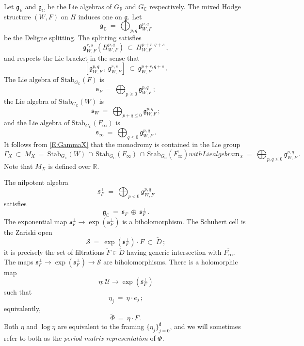 \documentclass[12pt]{amsart}
\numberwithin{equation}{section}
\numberwithin{table}{section}
\def\bC{\mathbb{C}}
\def\fg{\mathfrak{g}}
\def\fm{\mathfrak{m}}
\def\bR{\mathbb{R}}
\def\sS{\mathscr{S}}
\def\tStab{\mathrm{Stab}}
\def\cU{\mathcal{U}}
\def\op{\oplus}
\theoremstyle{definition}
\theoremstyle{definition}
\theoremstyle{remark}
\def\sfd{\mathsf{d}}
\def\fs{\mathfrak{s}}
\def\tPhi{\tilde\Phi}
\begin{document}
Let $\fg_\bR$ and $\fg_\bC$ be the Lie algebras of $G_\bR$ and $G_\bC$ respectively.  The mixed Hodge structure $(W,F)$ on $H$ induces one on $\fg$.  Let 
\begin{equation}\label{E:gpq}
  \fg_\bC \ = \ \bigoplus_{p,q} \fg^{p,q}_{W,F}
\end{equation}
be the Deligne splitting.  The splitting satisfies
\begin{equation}\label{E:g(H)}
  \fg^{r,s}_{W,F}(H^{p,q}_{W,F}) \ \subset \ H^{p+r,q+s}_{W,F} \,,
\end{equation}
and respects the Lie bracket in the sense that 
\begin{equation}\label{E:adg}
  [ \fg^{p,q}_{W,F} \,,\, \fg^{r,s}_{W,F} ] 
  \ \subset \ \fg^{p+r,q+s}_{W,F} \,.
\end{equation}
The Lie algebra of $\tStab_{G_\bC}(F)$ is
\[
  \fs_F \ = \ \bigoplus_{p\ge0} \fg^{p,q}_{W,F} \,;
\]
the Lie algebra of $\tStab_{G_\bC}(W)$ is
\[
  \fs_W \ = \ \bigoplus_{p+q\le0}\fg^{p,q}_{W,F} \,;
\]
and the Lie algebra of $\tStab_{G_\bC}(F_\infty)$ is
\[
  \fs_\infty \ = \ \bigoplus_{q\le0} \fg^{p,q}_{W,F} \,.
\]
It follows from \eqref{E:GammaX} that the monodromy is contained in the Lie group
\begin{subequations}\label{SE:MX}
\begin{equation}\label{E:MX}
  \Gamma_X \ \subset \ M_X \ = \ \tStab_{G_\bC}(W) \,\cap\,
  \tStab_{G_\bC}(F_\infty) \,\cap\,\tStab_{G_\bC}(\overline{F_\infty})
\end{equation}
with Lie algebra 
\begin{equation}\label{E:mX}
   \fm_X \ = \ \bigoplus_{p,q\le0} \fg^{p,q}_{W,F} \,.
\end{equation}
\end{subequations}
Note that $M_X$ is defined over $\bR$.

The nilpotent algebra 
\begin{equation}\label{E:sFperp}
  \fs^\perp_F \ = \ \bigoplus_{p<0} \fg^{p,q}_{W,F}
\end{equation}
satisfies
\[
  \fg_\bC \ = \ \fs_F \ \op \ \fs_F^\perp \,.
\]
The exponential map $\fs^\perp_F \to \exp(\fs^\perp_F)$ is a biholomorphism.  The Schubert cell is the Zariski open
\[
    \sS \ = \ \exp(\fs^\perp_F) \cdot F \ \subset \ \check D \,;
\]
it is precisely the set of filtrations $\tilde F\in \check D$ having generic intersection with $\overline{F_\infty}$.  The maps $\fs^\perp_F \to \exp(\fs^\perp_F) \to \sS$ are biholomorphisms.  There is a holomorphic map 
\begin{equation}\label{E:eta}
	\eta : \cU \to \exp(\fs^\perp_F)
\end{equation}
such that 
\[
  \eta_j \ = \ \eta\cdot e_j \,;
\]
equivalently,
\[
  \tPhi \ = \ \eta \cdot F \,.
\]
Both $\eta$ and $\log \eta$ are equivalent to the framing $\{ \eta_j\}_{j=0}^\sfd$, and we will sometimes refer to both as the \emph{period matrix representation} of $\Phi$.
\end{document}
